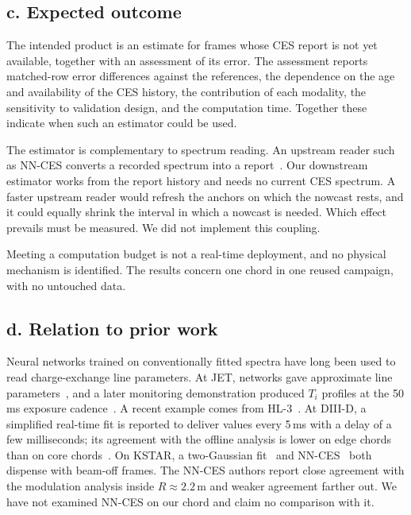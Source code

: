\documentclass[11pt,a4paper]{article}
\begin{document}
\subsection*{c. Expected outcome}
The intended product is an estimate for frames whose CES report is not yet available, together with an assessment of its error. The assessment reports matched-row error differences against the references, the dependence on the age and availability of the CES history, the contribution of each modality, the sensitivity to validation design, and the computation time. Together these indicate when such an estimator could be used.

The estimator is complementary to spectrum reading. An upstream reader such as NN-CES converts a recorded spectrum into a report~\citep{Lee2026NeuralNetworkbased}. Our downstream estimator works from the report history and needs no current CES spectrum. A faster upstream reader would refresh the anchors on which the nowcast rests, and it could equally shrink the interval in which a nowcast is needed. Which effect prevails must be measured. We did not implement this coupling.

Meeting a computation budget is not a real-time deployment, and no physical mechanism is identified. The results concern one chord in one reused campaign, with no untouched data.

\subsection*{d. Relation to prior work}
Neural networks trained on conventionally fitted spectra have long been used to read charge-exchange line parameters. At JET, networks gave approximate line parameters~\citep{Bishop1993AutomaticAnalysis}, and a later monitoring demonstration produced $T_i$ profiles at the 50\,ms exposure cadence~\citep{Svensson1999AnalysisJet}. A recent example comes from HL-3~\citep{Tian2026RealTimeCxrs}. At DIII-D, a simplified real-time fit is reported to deliver values every 5\,ms with a delay of a few milliseconds; its agreement with the offline analysis is lower on edge chords than on core chords~\citep{Chrystal2026RealTime}. On KSTAR, a two-Gaussian fit~\citep{Lee2020TwoGaussian} and NN-CES~\citep{Lee2026NeuralNetworkbased} both dispense with beam-off frames. The NN-CES authors report close agreement with the modulation analysis inside $R\approx2.2$\,m and weaker agreement farther out. We have not examined NN-CES on our chord and claim no comparison with it.
\end{document}
